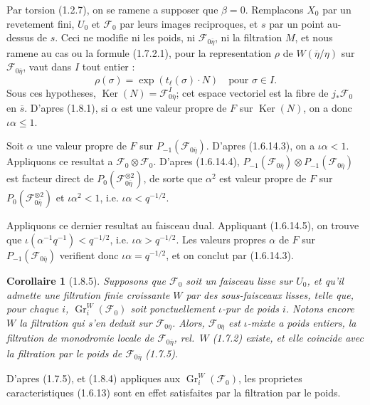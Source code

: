 \documentclass[12pt,a4paper]{article}
\theoremstyle{plain}
\newtheorem{corollaire}[theorem]{Corollaire}
\theoremstyle{definition}
\theoremstyle{definition}
\theoremstyle{remark}
\DeclareMathOperator{\Gr}{Gr}
\DeclareMathOperator{\Ker}{Ker}
\begin{document}
Par torsion (1.2.7), on se ramene a supposer que $\beta = 0$. Remplacons $X_0$ par un revetement fini, $U_0$ et $\mathscr{F}_0$ par leurs images reciproques, et $s$ par un point au-dessus de $s$. Ceci ne modifie ni les poids, ni $\mathscr{F}_{0\overline{\eta}}$, ni la filtration $M$, et nous ramene au cas ou la formule (1.7.2.1), pour la representation $\rho$ de $W(\overline{\eta}/\eta)$ sur $\mathscr{F}_{0\overline{\eta}}$, vaut dans $I$ tout entier :
\[\rho(\sigma) = \exp(t_\ell(\sigma) \cdot N) \quad \text{pour } \sigma \in I.\]
Sous ces hypotheses, $\Ker(N) = \mathscr{F}_{0\overline{\eta}}^{I}$; cet espace vectoriel est la fibre de $j_* \mathscr{F}_0$ en $\overline{s}$. D'apres (1.8.1), si $\alpha$ est une valeur propre de $F$ sur $\Ker(N)$, on a donc $\iota\alpha \leq 1$.

Soit $\alpha$ une valeur propre de $F$ sur $P_{-1}(\mathscr{F}_{0\overline{\eta}})$. D'apres (1.6.14.3), on a $\iota\alpha < 1$. Appliquons ce resultat a $\mathscr{F}_0 \otimes \mathscr{F}_0$. D'apres (1.6.14.4), $P_{-1}(\mathscr{F}_{0\overline{\eta}}) \otimes P_{-1}(\mathscr{F}_{0\overline{\eta}})$ est facteur direct de $P_0(\mathscr{F}_{0\overline{\eta}}^{\otimes 2})$, de sorte que $\alpha^2$ est valeur propre de $F$ sur $P_0(\mathscr{F}_{0\overline{\eta}}^{\otimes 2})$ et $\iota\alpha^2 < 1$, i.e. $\iota\alpha < q^{-1/2}$.

Appliquons ce dernier resultat au faisceau dual. Appliquant (1.6.14.5), on trouve que $\iota(\alpha^{-1} q^{-1}) < q^{-1/2}$, i.e. $\iota\alpha > q^{-1/2}$. Les valeurs propres $\alpha$ de $F$ sur $P_{-1}(\mathscr{F}_{0\overline{\eta}})$ verifient donc $\iota\alpha = q^{-1/2}$, et on conclut par (1.6.14.3).

\begin{corollaire}[1.8.5]
Supposons que $\mathscr{F}_0$ soit un faisceau lisse sur $U_0$, et qu'il admette une filtration finie croissante $W$ par des sous-faisceaux lisses, telle que, pour chaque $i$, $\Gr_i^W(\mathscr{F}_0)$ soit ponctuellement $\iota$-pur de poids $i$. Notons encore $W$ la filtration qui s'en deduit sur $\mathscr{F}_{0\overline{\eta}}$. Alors, $\mathscr{F}_{0\overline{\eta}}$ est $\iota$-mixte a poids entiers, la filtration de monodromie locale de $\mathscr{F}_{0\overline{\eta}}$, rel.~$W$ (1.7.2) existe, et elle coincide avec la filtration par le poids de $\mathscr{F}_{0\overline{\eta}}$ (1.7.5).
\end{corollaire}

D'apres (1.7.5), et (1.8.4) appliques aux $\Gr_i^W(\mathscr{F}_0)$, les proprietes caracteristiques (1.6.13) sont en effet satisfaites par la filtration par le poids.
\end{document}
